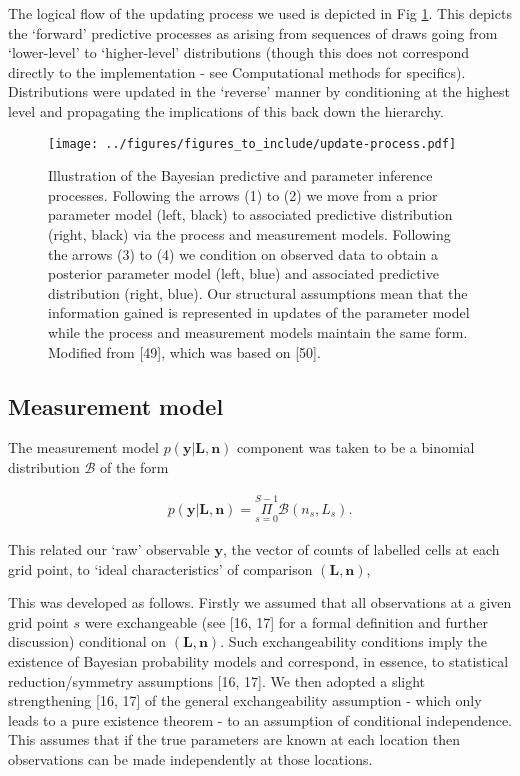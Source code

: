 \documentclass[10pt,letterpaper]{article}
\begin{document}
The logical flow of the updating process we used is depicted in Fig
\ref{fig:update-process}. This depicts the `forward' predictive
processes as arising from sequences of draws going from `lower-level' to
`higher-level' distributions (though this does not correspond directly
to the implementation - see Computational methods for specifics).
Distributions were updated in the `reverse' manner by conditioning at
the highest level and propagating the implications of this back down the
hierarchy.

\begin{figure}
\centering
\texttt{[image: ../figures/figures\_to\_include/update-process.pdf]}
\caption{Illustration of the Bayesian predictive and parameter inference
processes. Following the arrows (1) to (2) we move from a prior
parameter model (left, black) to associated predictive distribution
(right, black) via the process and measurement models. Following the
arrows (3) to (4) we condition on observed data to obtain a posterior
parameter model (left, blue) and associated predictive distribution
(right, blue). Our structural assumptions mean that the information
gained is represented in updates of the parameter model while the
process and measurement models maintain the same form. Modified from
{[}49{]}, which was based on {[}50{]}.\label{fig:update-process}}
\end{figure}

\subsection{Measurement model}\label{measurement-model}

The measurement model \(p(\mathbf{y}|\mathbf{L},\mathbf{n})\) component
was taken to be a binomial distribution \(\mathcal{B}\) of the form

\begin{align}p(\mathbf{y}|\mathbf{L},\mathbf{n}) = \underset{s=0}{\overset{S-1}{\Pi}}\mathcal{B}(n_s,L_s).\end{align}

This related our `raw' observable \(\mathbf{y}\), the vector of counts
of labelled cells at each grid point, to `ideal characteristics' of
comparison \((\mathbf{L},\mathbf{n})\),

This was developed as follows. Firstly we assumed that all observations
at a given grid point \(s\) were exchangeable (see {[}16, 17{]} for a
formal definition and further discussion) conditional on
\((\mathbf{L},\mathbf{n})\). Such exchangeability conditions imply the
existence of Bayesian probability models and correspond, in essence, to
statistical reduction/symmetry assumptions {[}16, 17{]}. We then adopted
a slight strengthening {[}16, 17{]} of the general exchangeability
assumption - which only leads to a pure existence theorem - to an
assumption of conditional independence. This assumes that if the true
parameters are known at each location then observations can be made
independently at those locations.
\end{document}
